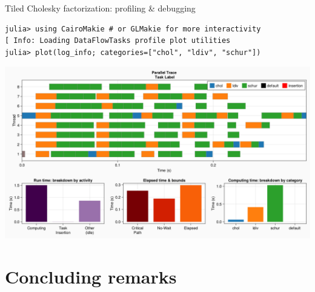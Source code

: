 \documentclass{beamer}
\begin{document}
\begin{frame}[fragile]{Tiled Cholesky factorization: profiling \& debugging}
\begin{verbatim}
julia> using CairoMakie # or GLMakie for more interactivity
[ Info: Loading DataFlowTasks profile plot utilities
julia> plot(log_info; categories=["chol", "ldiv", "schur"])
\end{verbatim}
\includegraphics[width=\textwidth]{Cholesky_profile.png}
\end{frame}





\section{Concluding remarks}

\end{document}
